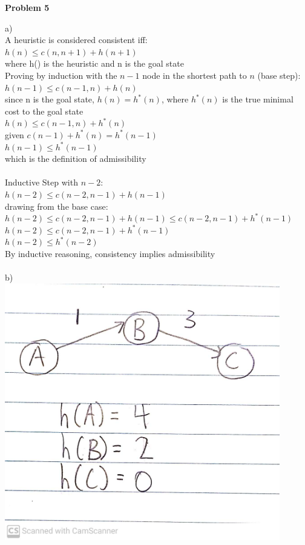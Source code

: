 \documentclass[11pt]{article}
\begin{document}
    \begin{center}
        \Large
        \textbf{Problem 5}
    \end{center}
    \normalsize
    a)\\
    A heuristic is considered consistent iff:\\
        $h(n) \leq c(n,n+1) + h(n+1)$\\
        where h() is the heuristic and n is the goal state\\
        Proving by induction with the $n-1$ node in the shortest path to $n$ (base step):\\
        $h(n-1) \leq c(n-1,n) + h(n)$\\
        since n is the goal state, $h(n)=h^*(n)$, where $h^*(n)$ is the true minimal cost to the goal state\\
        $h(n) \leq c(n-1,n) + h^*(n)$\\
        given $c(n-1) + h^*(n) = h^*(n-1)$\\
        $h(n-1) \leq h^*(n-1)$\\
        which is the definition of admissibility\\\\
        Inductive Step with $n-2$:\\
        $h(n-2) \leq c(n-2,n-1) + h(n-1)$\\
        drawing from the base case:\\
        $h(n-2) \leq c(n-2,n-1) + h(n-1) \leq c(n-2,n-1) + h^*(n-1)$\\
        $h(n-2)\leq c(n-2,n-1) + h^*(n-1)$\\
        $h(n-2) \leq h^*(n-2)$\\
        By inductive reasoning, consistency implies admissibility\\\\
    b)\\
    \includegraphics[width=0.9\textwidth]{images/prob_5_heuristic}
    
\end{document}

